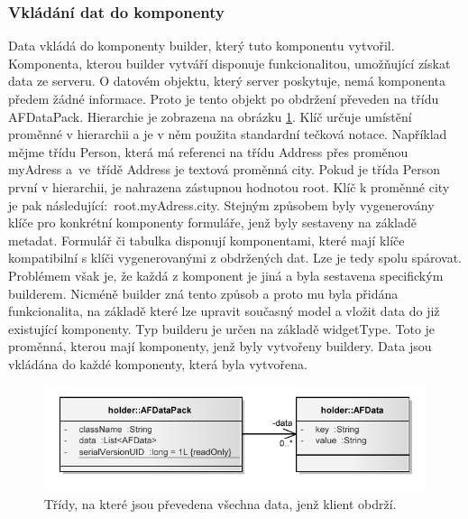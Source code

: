 \subsubsection{Vkládání dat do komponenty}
Data vkládá do komponenty builder, který tuto komponentu vytvořil. Komponenta, kterou builder vytváří disponuje funkcionalitou, umožňující získat data ze serveru. O datovém objektu, který server poskytuje, nemá komponenta předem žádné informace. Proto je tento objekt po obdržení převeden na třídu AFDataPack. Hierarchie je zobrazena na obrázku \ref{img:dataPack}. Klíč určuje umístění proměnné v hierarchii a je v něm použita standardní tečková notace. Například mějme třídu Person, která má referenci na třídu Address přes proměnou myAdress a~ve~třídě Address je textová proměnná city. Pokud je třída Person první v hierarchii, je nahrazena zástupnou hodnotou root. Klíč k proměnné city je pak následující:~root.myAdress.city. Stejným způsobem byly vygenerovány klíče pro konkrétní komponenty formuláře, jenž byly sestaveny na základě metadat. Formulář či tabulka disponují komponentami, které mají klíče kompatibilní s klíči vygenerovanými z obdržených dat. Lze je tedy spolu spárovat. Problémem však je, že každá z komponent je jiná a byla sestavena specifickým builderem. Nicméně builder zná tento způsob a proto mu byla přidána funkcionalita, na základě které lze upravit současný model a vložit data do již existující komponenty. Typ builderu je určen na základě widgetType. Toto je proměnná, kterou mají komponenty, jenž byly vytvořeny buildery. Data jsou vkládána do každé komponenty, která byla vytvořena.

\begin{figure}[h!]
\begin{center}
\includegraphics{images/dataPack}
\caption{Třídy, na které jsou převedena všechna data, jenž klient obdrží.}
\label{img:dataPack}
\end{center}
\end{figure}

